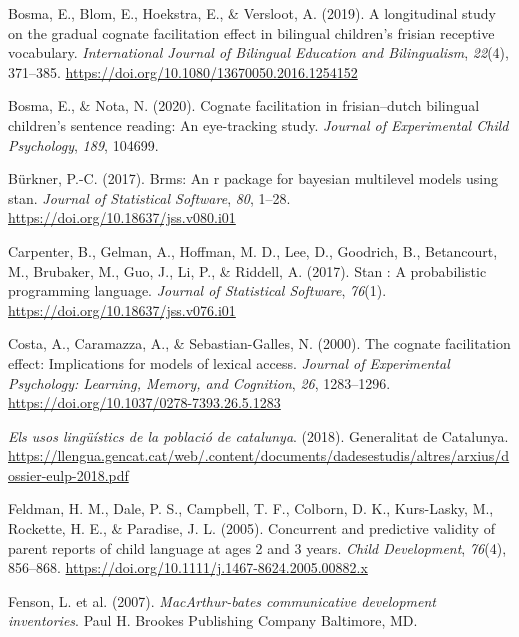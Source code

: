 \documentclass[
]{article}
\newlength{\cslhangindent}
\newlength{\cslentryspacingunit} %
\newenvironment{CSLReferences}[2] %
 {%
  \setlength{\parindent}{0pt}
  \ifodd #1
  \let\oldpar\par
  \def\par{\hangindent=\cslhangindent\oldpar}
  \fi
  \setlength{\parskip}{#2\cslentryspacingunit}
 }%
 {}
\begin{document}
\begin{CSLReferences}{1}{0}
\leavevmode{}%
Bosma, E., Blom, E., Hoekstra, E., \& Versloot, A. (2019). A
longitudinal study on the gradual cognate facilitation effect in
bilingual children's frisian receptive vocabulary. \emph{International
Journal of Bilingual Education and Bilingualism}, \emph{22}(4),
371--385. \url{https://doi.org/10.1080/13670050.2016.1254152}

\leavevmode{}%
Bosma, E., \& Nota, N. (2020). Cognate facilitation in frisian--dutch
bilingual children's sentence reading: An eye-tracking study.
\emph{Journal of Experimental Child Psychology}, \emph{189}, 104699.

\leavevmode{}%
Bürkner, P.-C. (2017). Brms: An r package for bayesian multilevel models
using stan. \emph{Journal of Statistical Software}, \emph{80}, 1--28.
\url{https://doi.org/10.18637/jss.v080.i01}

\leavevmode{}%
Carpenter, B., Gelman, A., Hoffman, M. D., Lee, D., Goodrich, B.,
Betancourt, M., Brubaker, M., Guo, J., Li, P., \& Riddell, A. (2017).
Stan : A probabilistic programming language. \emph{Journal of
Statistical Software}, \emph{76}(1).
\url{https://doi.org/10.18637/jss.v076.i01}

\leavevmode{}%
Costa, A., Caramazza, A., \& Sebastian-Galles, N. (2000). The cognate
facilitation effect: Implications for models of lexical access.
\emph{Journal of Experimental Psychology: Learning, Memory, and
Cognition}, \emph{26}, 1283--1296.
\url{https://doi.org/10.1037/0278-7393.26.5.1283}

\leavevmode{}%
\emph{Els usos lingüístics de la població de catalunya}. (2018).
Generalitat de Catalunya.
\url{https://llengua.gencat.cat/web/.content/documents/dadesestudis/altres/arxius/dossier-eulp-2018.pdf}

\leavevmode{}%
Feldman, H. M., Dale, P. S., Campbell, T. F., Colborn, D. K.,
Kurs-Lasky, M., Rockette, H. E., \& Paradise, J. L. (2005). Concurrent
and predictive validity of parent reports of child language at ages 2
and 3 years. \emph{Child Development}, \emph{76}(4), 856--868.
\url{https://doi.org/10.1111/j.1467-8624.2005.00882.x}

\leavevmode{}%
Fenson, L. et al. (2007). \emph{{MacArthur}-bates communicative
development inventories}. Paul H. Brookes Publishing Company Baltimore,
{MD}.


\end{CSLReferences}
\end{document}
